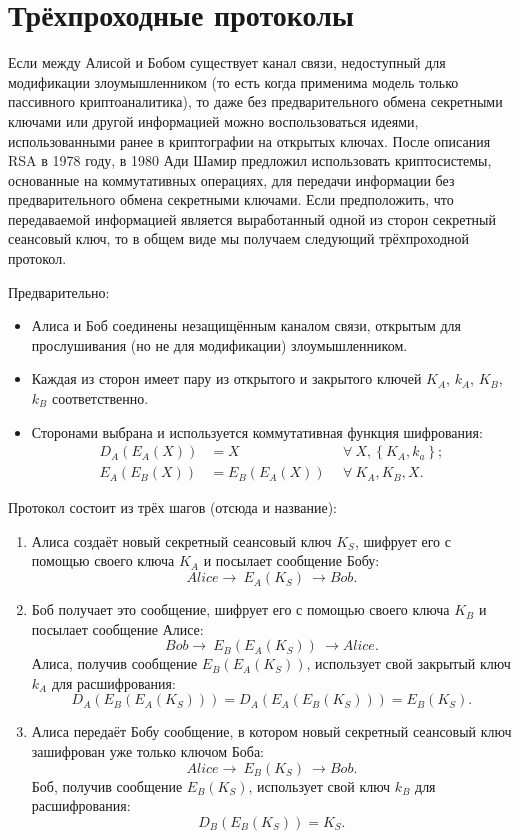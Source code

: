 \section{Трёхпроходные протоколы}

Если между Алисой и Бобом существует канал связи, недоступный для модификации злоумышленником (то есть когда применима модель только пассивного криптоаналитика), то даже без предварительного обмена секретными ключами или другой информацией можно воспользоваться идеями, использованными ранее в криптографии на открытых ключах. После описания RSA в 1978 году, в 1980 Ади Шамир предложил использовать криптосистемы, основанные на коммутативных операциях, для передачи информации без предварительного обмена секретными ключами. Если предположить, что передаваемой информацией является выработанный одной из сторон секретный сеансовый ключ, то в общем виде мы получаем следующий трёхпроходной протокол.

Предварительно:

\begin{itemize}
	\item Алиса и Боб соединены незащищённым каналом связи, открытым для прослушивания (но не для модификации) злоумышленником.
	\item Каждая из сторон имеет пару из открытого и закрытого ключей $K_A$, $k_A$, $K_B$, $k_B$ соответственно.
	\item Сторонами выбрана и используется коммутативная функция шифрования:
	\begin{align*}
		D_{A} \left( E_{A} \left( X \right) \right)	&= X		& ~~\forall ~ X, \left\{ K_A, k_a \right\}; \\
		E_{A} \left( E_{B} \left( X \right) \right)	&= E_B \left( E_A \left( X \right) \right) & ~~\forall ~ K_A, K_B, X.
	\end{align*}
\end{itemize}

Протокол состоит из трёх шагов (отсюда и название):
\begin{enumerate}
    \item Алиса создаёт новый секретный сеансовый ключ $K_S$, шифрует его с помощью своего ключа $K_A$ и посылает сообщение Бобу:
        \[ Alice \rightarrow ~ E_A \left( K_S \right) ~ \rightarrow Bob. \]
    \item Боб получает это сообщение, шифрует его с помощью своего ключа $K_B$ и посылает сообщение Алисе:
        \[ Bob \rightarrow ~ E_B \left( E_A \left( K_S \right) \right) ~ \rightarrow Alice. \]
    Алиса, получив сообщение $E_B \left( E_A \left( K_S \right) \right)$, использует свой закрытый ключ $k_A$ для расшифрования:
	\[ D_A \left( E_B \left( E_A \left( K_S \right) \right) \right) = D_A \left( E_A \left( E_B \left( K_S \right) \right) \right) = E_B \left( K_S \right). \]
    \item Алиса передаёт Бобу сообщение, в котором новый секретный сеансовый ключ зашифрован уже только ключом Боба:
        \[ Alice \rightarrow ~ E_B \left( K_S \right) ~ \rightarrow Bob. \]
    Боб, получив сообщение $E_B \left( K_S \right)$, использует свой ключ $k_B$ для расшифрования:
	\[ D_B \left( E_B \left( K_S \right) \right) = K_S. \]
\end{enumerate}

